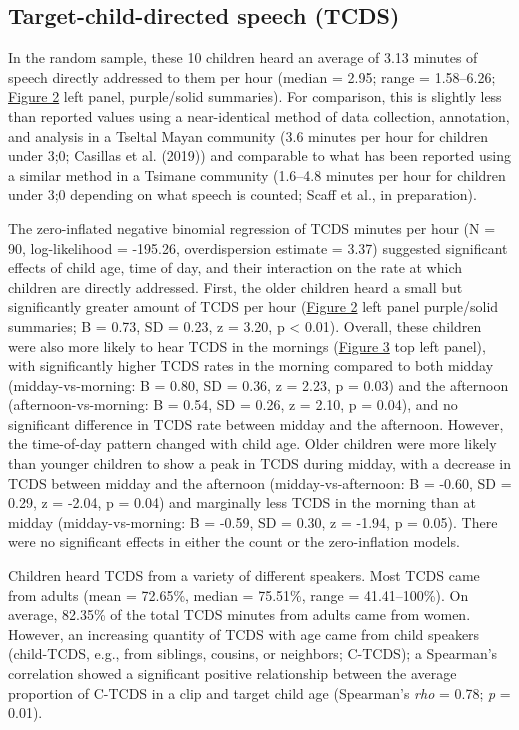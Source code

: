 \documentclass[,man,floatsintext]{apa6}
\begin{document}
\subsection{Target-child-directed speech
(TCDS)}\label{target-child-directed-speech-tcds}

In the random sample, these 10 children heard an average of 3.13 minutes
of speech directly addressed to them per hour (median = 2.95; range =
1.58--6.26; \protect\hyperlink{fig2}{Figure 2} left panel, purple/solid
summaries). For comparison, this is slightly less than reported values
using a near-identical method of data collection, annotation, and
analysis in a Tseltal Mayan community (3.6 minutes per hour for children
under 3;0; Casillas et al. (2019)) and comparable to what has been
reported using a similar method in a Tsimane community (1.6--4.8 minutes
per hour for children under 3;0 depending on what speech is counted;
Scaff et al., in preparation).

The zero-inflated negative binomial regression of TCDS minutes per hour
(N = 90, log-likelihood = -195.26, overdispersion estimate = 3.37)
suggested significant effects of child age, time of day, and their
interaction on the rate at which children are directly addressed. First,
the older children heard a small but significantly greater amount of
TCDS per hour (\protect\hyperlink{fig2}{Figure 2} left panel
purple/solid summaries; B = 0.73, SD = 0.23, z = 3.20, p \textless{}
0.01). Overall, these children were also more likely to hear TCDS in the
mornings (\protect\hyperlink{fig3}{Figure 3} top left panel), with
significantly higher TCDS rates in the morning compared to both midday
(midday-vs-morning: B = 0.80, SD = 0.36, z = 2.23, p = 0.03) and the
afternoon (afternoon-vs-morning: B = 0.54, SD = 0.26, z = 2.10, p =
0.04), and no significant difference in TCDS rate between midday and the
afternoon. However, the time-of-day pattern changed with child age.
Older children were more likely than younger children to show a peak in
TCDS during midday, with a decrease in TCDS between midday and the
afternoon (midday-vs-afternoon: B = -0.60, SD = 0.29, z = -2.04, p =
0.04) and marginally less TCDS in the morning than at midday
(midday-vs-morning: B = -0.59, SD = 0.30, z = -1.94, p = 0.05). There
were no significant effects in either the count or the zero-inflation
models.

Children heard TCDS from a variety of different speakers. Most TCDS came
from adults (mean = 72.65\%, median = 75.51\%, range = 41.41--100\%). On
average, 82.35\% of the total TCDS minutes from adults came from women.
However, an increasing quantity of TCDS with age came from child
speakers (child-TCDS, e.g., from siblings, cousins, or neighbors;
C-TCDS); a Spearman's correlation showed a significant positive
relationship between the average proportion of C-TCDS in a clip and
target child age (Spearman's \emph{rho} = 0.78; \emph{p} = 0.01).
\end{document}
